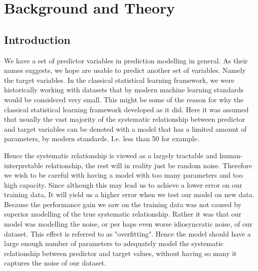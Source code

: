 \documentclass[nofootinbib,UKenglish,nobalancelastpage,12pt]{article}
\begin{document}
\section{Background and Theory}
\subsection{Introduction}
We have a set of predictor variables in prediction modelling in general. As their names suggests, we hope are usable to predict another set of variables. Namely the target variables. In the classical statistical learning framework, we were historically working with datasets that by modern machine learning standards would be considered very small. This might be some of the reason for why the classical statistical learning framework developed as it did. Here it was assumed that usually the vast majority of the systematic relationship between predictor and target variables can be denoted with a model that has a limited amount of parameters, by modern standards. I.e. less than 50 for example.

Hence the systematic relationship is viewed as a largely tractable and human-interpretable relationship, the rest will in reality just be random noise. Therefore we wish to be careful with having a model with too many parameters and too high capacity. Since although this may lead us to achieve a lower error on our training data, It will yield us a higher error when we test our model on new data. Because the performance gain we saw on the training data was not caused by superior modelling of the true systematic relationship. Rather it was that our model was modelling the noise, or per haps even worse idiosyncratic noise, of our dataset. This effect is referred to as "overfitting". Hence the model should have a large enough number of parameters to adequately model the systematic relationship between predictor and target values, without having so many it captures the noise of our dataset.

\end{document}
